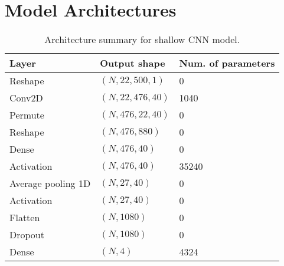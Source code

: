 \documentclass{article}
\begin{document}

\section{Model Architectures}
\begin{table}[H]
\small
\begin{center}
    \begin{tabular}{|l|l|l|}
        \hline
        Layer   & Output shape  & Num. of parameters \\
        \hline\hline
        Reshape             & $(N, 22, 500, 1)$     & 0     \\
        Conv2D              & $(N, 22, 476, 40)$    & 1040  \\
        Permute             & $(N, 476, 22, 40)$    & 0     \\
        Reshape             & $(N, 476, 880)$       & 0     \\
        Dense               & $(N, 476, 40)$        & 0     \\
        Activation          & $(N, 476, 40)$        & 35240 \\
        Average pooling 1D  & $(N, 27, 40)$         & 0     \\
        Activation          & $(N, 27, 40)$         & 0     \\
        Flatten             & $(N, 1080)$           & 0     \\
        Dropout             & $(N, 1080)$           & 0     \\
        Dense               & $(N, 4)$              & 4324  \\
        \hline
    \end{tabular}
\end{center}
\caption{Architecture summary for shallow CNN model.}
\label{tab:shallow}
\end{table}
\end{document}
